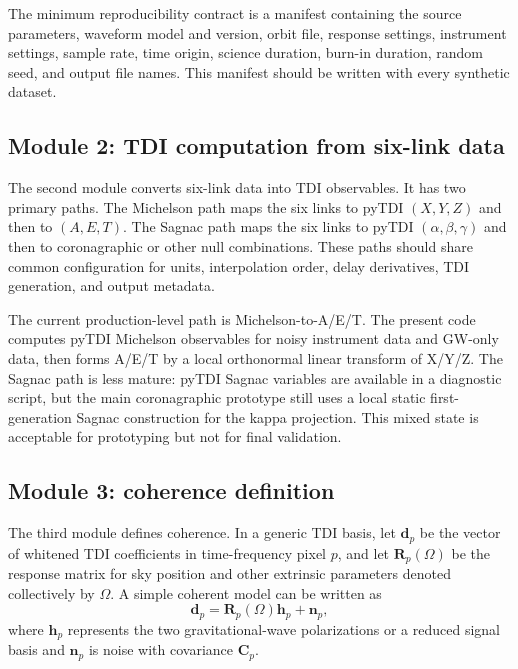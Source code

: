 \documentclass[%
 reprint,
 amsmath,amssymb,
 aps,
 prd,
]{revtex4-2}
\begin{document}
The minimum reproducibility contract is a manifest containing the source parameters, waveform model and version, orbit file, response settings, instrument settings, sample rate, time origin, science duration, burn-in duration, random seed, and output file names.  This manifest should be written with every synthetic dataset.

\subsection{Module 2: TDI computation from six-link data}
\label{subsec:tdi_module}

The second module converts six-link data into TDI observables.  It has two primary paths.  The Michelson path maps the six links to pyTDI $(X,Y,Z)$ and then to $(A,E,T)$.  The Sagnac path maps the six links to pyTDI $(\alpha,\beta,\gamma)$ and then to coronagraphic or other null combinations.  These paths should share common configuration for units, interpolation order, delay derivatives, TDI generation, and output metadata.

The current production-level path is Michelson-to-A/E/T.  The present code computes pyTDI Michelson observables for noisy instrument data and GW-only data, then forms A/E/T by a local orthonormal linear transform of X/Y/Z.  The Sagnac path is less mature: pyTDI Sagnac variables are available in a diagnostic script, but the main coronagraphic prototype still uses a local static first-generation Sagnac construction for the kappa projection.  This mixed state is acceptable for prototyping but not for final validation.

\subsection{Module 3: coherence definition}
\label{subsec:coherence_module}

The third module defines coherence.  In a generic TDI basis, let $\mathbf d_p$ be the vector of whitened TDI coefficients in time-frequency pixel $p$, and let $\mathbf R_p(\Omega)$ be the response matrix for sky position and other extrinsic parameters denoted collectively by $\Omega$.  A simple coherent model can be written as
\begin{equation}
\mathbf d_p = \mathbf R_p(\Omega)\mathbf h_p + \mathbf n_p,
\label{eq:data_model}
\end{equation}
where $\mathbf h_p$ represents the two gravitational-wave polarizations or a reduced signal basis and $\mathbf n_p$ is noise with covariance $\mathbf C_p$.
\end{document}
